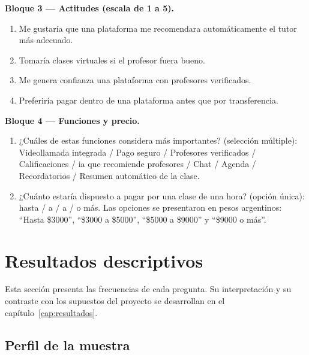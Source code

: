 \textbf{Bloque 3 --- Actitudes (escala de 1 a 5).}

\begin{enumerate}[resume]
    \item Me gustaría que una plataforma me recomendara automáticamente
          el tutor más adecuado.
    \item Tomaría clases virtuales si el profesor fuera bueno.
    \item Me genera confianza una plataforma con profesores verificados.
    \item Preferiría pagar dentro de una plataforma antes que por
          transferencia.
\end{enumerate}

\textbf{Bloque 4 --- Funciones y precio.}

\begin{enumerate}[resume]
    \item ¿Cuáles de estas funciones considera más importantes?
          (selección múltiple): Videollamada integrada / Pago seguro /
          Profesores verificados / Calificaciones / \gls{ia} que
          recomiende profesores / Chat / Agenda / Recordatorios / Resumen
          automático de la clase.
    \item ¿Cuánto estaría dispuesto a pagar por una clase de una hora?
          (opción única): hasta  /  a  /
           a  /  o más. Las opciones se
          presentaron en pesos argentinos: ``Hasta \$3000'', ``\$3000 a
          \$5000'', ``\$5000 a \$9000'' y ``\$9000 o más''.
\end{enumerate}

\section{Resultados descriptivos}

Esta sección presenta las frecuencias de cada pregunta. Su
interpretación y su contraste con los supuestos del proyecto se
desarrollan en el capítulo~\ref{cap:resultados}.

\subsection{Perfil de la muestra}


